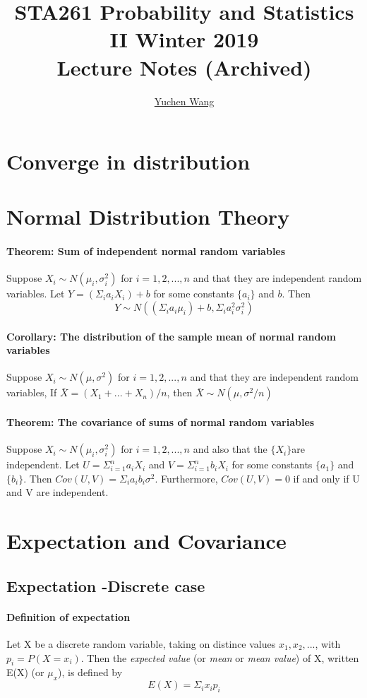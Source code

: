\documentclass[11pt]{article}
\title{STA261 Probability and Statistics II Winter 2019\\ Lecture Notes (Archived)}
\author{\textcolor{blue}{\href{https://www.yuchenwyc.com}{Yuchen Wang}}}
\newcommand{\ti}[1]{\textit{#1}}
\begin{document}
	\maketitle
	\tableofcontents
	\newpage
\section{Converge in distribution}
\section{Normal Distribution Theory}
\paragraph{Theorem: Sum of independent normal random variables}
Suppose $X_i \sim N(\mu_i, \sigma^2_i)$ for $i = 1, 2,...,n$ and that they are independent random variables. Let $Y = (\Sigma_ia_iX_i) + b$ for some constants $\{a_i\}$ and $b$. Then
$$Y \sim N((\Sigma_ia_i\mu_i)+b, \Sigma_ia^2_i\sigma^2_i)$$
\paragraph{Corollary: The distribution of the sample mean of normal random variables} Suppose $X_i \sim N(\mu, \sigma^2)$ for $i=1,2,...,n$ and that they are independent random variables, If $\bar X = (X_1 + ... +X_n)/n$, then $\bar X \sim N(\mu,\sigma^2/n)$
\paragraph{Theorem: The covariance of sums of normal random variables}Suppose $X_i \sim N(\mu_i, \sigma_i^2)$ for $i=1,2,...,n$ and also that the $\{X_i\} $are independent. Let $U=\Sigma^n_{i=1}a_iX_i$ and $V=\Sigma^n_{i=1}b_iX_i$ for some constants $\{a_1\}$ and $\{b_i\}$. Then $Cov(U,V) = \Sigma_ia_ib_i\sigma^2$. Furthermore, $Cov(U,V) = 0$ if and only if U and V are independent.
\section{Expectation and Covariance}
\subsection{Expectation -Discrete case}
\paragraph{Definition of expectation} Let X be a discrete random variable, taking on distince values $x_1,x_2,...$, with $p_i = P(X = x_i)$. Then the \ti{expected value} (or \ti{mean} or \ti{mean value}) of X, written E(X) (or $\mu_x$), is defined by $$E(X) = \Sigma_i x_ip_i$$
\end{document}
